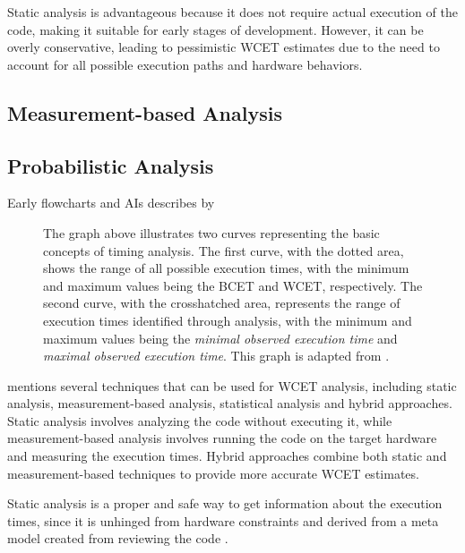 Static analysis is advantageous because it does not require actual execution of the code, making it suitable for early stages of development. However, it can be overly conservative, leading to pessimistic WCET estimates due to the need to account for all possible execution paths and hardware behaviors.

\subsection{Measurement-based Analysis}
\label{sec:measurement_analysis}

\subsection{Probabilistic Analysis}
\label{sec:probabilistic_analysis}

Early flowcharts and \ac{AI}s describes by \textcite{cousotAbstractInterpretationUnified1977}


\begin{figure}[htbp]
	\centering
	\resizebox{\textwidth}{!}{
		
	}
	\caption{
		The graph above illustrates two curves representing the basic concepts of timing analysis.
		The first curve, with the dotted area, shows the range of all possible execution times, with the minimum and maximum values being the \ac{BCET} and \ac{WCET}, respectively.
		The second curve, with the crosshatched area, represents the range of execution times identified through analysis, with the minimum and maximum values being the \textit{minimal observed execution time} and \textit{maximal observed execution time}.
		This graph is adapted from \textcite{wilhelmWorstcaseExecutiontimeProblem2008}.
	}
	\label{fig:overestimation}
\end{figure}

\textcite{kelterWCETAnalysisOptimization} mentions several techniques that can be used for \ac{WCET} analysis, including static analysis, measurement-based analysis, statistical analysis and hybrid approaches.
Static analysis involves analyzing the code without executing it, while measurement-based analysis involves running the code on the target hardware and measuring the execution times.
Hybrid approaches combine both static and measurement-based techniques to provide more accurate \ac{WCET} estimates.

Static analysis is a proper and safe way to get information about the execution times, since it is unhinged from hardware constraints and derived from a meta model created from reviewing the code \cite{kelterWCETAnalysisOptimization}.


